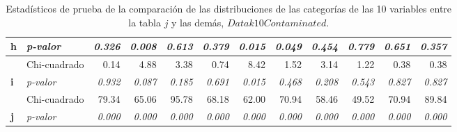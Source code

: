 \documentclass[mathematics,article,submit,moreauthors,pdftex]{mdpi}
\begin{document}
\begin{table}[H]
\begin{tabular}{llrrrrrrrrrr}
\multirow{-2}{*}{\textbf{h}}               & \textit{p-valor}                           & \textit{0.326}                        & {\color[HTML]{C00000} \textit{0.008}} & \textit{0.613}                        & \textit{0.379}                        & {\color[HTML]{C00000} \textit{0.015}} & {\color[HTML]{C00000} \textit{0.049}} & \textit{0.454}                        & \textit{0.779}                        & \textit{0.651}                        & \textit{0.357}                        \\ \hline
                                           & Chi-cuadrado                               & 0.14                                  & 4.88                                  & 3.38                                  & 0.74                                  & 8.42                                  & 1.52                                  & 3.14                                  & 1.22                                  & 0.38                                  & 0.38                                  \\ \cline{2-12} 
\multirow{-2}{*}{\textbf{i}}               & \textit{p-valor}                           & \textit{0.932}                        & \textit{0.087}                        & \textit{0.185}                        & \textit{0.691}                        & {\color[HTML]{C00000} \textit{0.015}} & \textit{0.468}                        & \textit{0.208}                        & \textit{0.543}                        & \textit{0.827}                        & \textit{0.827}                        \\ \hline
                                           & Chi-cuadrado                               & 79.34                                 & 65.06                                 & 95.78                                 & 68.18                                 & 62.00                                 & 70.94                                 & 58.46                                 & 49.52                                 & 70.94                                 & 89.84                                 \\ \cline{2-12} 
\multirow{-2}{*}{\textbf{j}}               & \textit{p-valor}                           & {\color[HTML]{C00000} \textit{0.000}} & {\color[HTML]{C00000} \textit{0.000}} & {\color[HTML]{C00000} \textit{0.000}} & {\color[HTML]{C00000} \textit{0.000}} & {\color[HTML]{C00000} \textit{0.000}} & {\color[HTML]{C00000} \textit{0.000}} & {\color[HTML]{C00000} \textit{0.000}} & {\color[HTML]{C00000} \textit{0.000}} & {\color[HTML]{C00000} \textit{0.000}} & {\color[HTML]{C00000} \textit{0.000}} \\ \hline
\end{tabular}

\caption{Estadísticos de prueba de la comparación de las distribuciones de las categorías de las 10 variables entre la tabla $j$ y las demás, $Datak10Contaminated$.}

\label{tab:tablapromfreqsumm}
\end{table}
\end{document}
